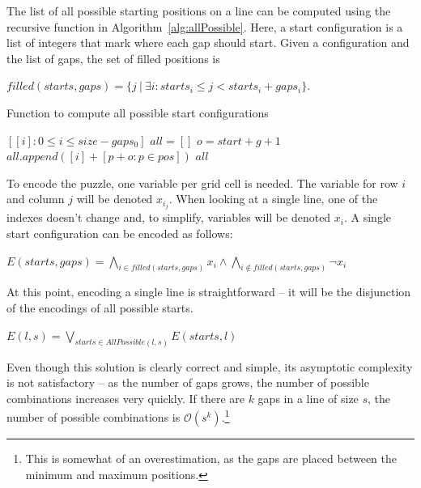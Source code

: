 \documentclass[12pt]{article}
\begin{document}
The list of all possible starting positions on a line can be computed using the recursive function in Algorithm~\ref{alg:allPossible}.
Here, a start configuration is a list of integers that mark where each gap should start.
Given a configuration and the list of gaps, the set of filled positions is

\begin{center}
  $filled(starts, gaps) = \{j\ |\ \exists i: starts_i \le j < starts_i + gaps_i\}$.
\end{center}

\begin{algorithm}
\caption{Function to compute all possible start configurations}\label{alg:allPossible}
\begin{algorithmic}
    \State\Return$[ [i]: 0 \le i \le size - gaps_0]$
  \Else
    \State$all = []$
      \State$o = start + g + 1$ 
          \State $all.append([i] + [p + o: p \in pos])$
      \EndFor
    \EndFor
    \State \Return $all$
  \EndIf
\EndFunction
\end{algorithmic}
\end{algorithm}

To encode the puzzle, one variable per grid cell is needed.
The variable for row $i$ and column $j$ will be denoted $x_i_j$.
When looking at a single line, one of the indexes doesn't change and, to simplify, variables will be denoted $x_i$.
A single start configuration can be encoded as follows:

\begin{center}
  $E(starts, gaps) = \bigwedge\limits_{i \in filled(starts, gaps)}x_i \wedge \bigwedge\limits_{i \notin filled(starts, gaps)} \neg x_i$
\end{center}

At this point, encoding a single line is straightforward -- it will be the disjunction of the encodings of all possible starts.

\begin{center}
  $E(l, s) = \bigvee_{starts \in AllPossible(l, s)} E(starts, l)$
\end{center}

Even though this solution is clearly correct and simple, its asymptotic complexity is not satisfactory -- as the number of gaps grows, the number of possible combinations increases very quickly.
If there are $k$ gaps in a line of size $s$, the number of possible combinations is $\mathcal{O}(s^k)$.\footnote{This is somewhat of an overestimation, as the gaps are placed between the minimum and maximum positions.}
\end{document}
